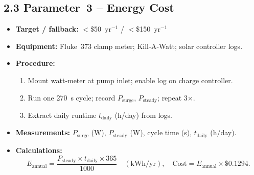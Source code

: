 \documentclass[12pt]{article}
\begin{document}
\subsection*{2.3 Parameter 3 – Energy Cost}
\begin{itemize}[leftmargin=*]
  \item \textbf{Target / fallback:} $<$\$50 yr$^{-1}$ / $<$\$150 yr$^{-1}$
  \item \textbf{Equipment:} Fluke 373 clamp meter; Kill‑A‑Watt; solar controller logs.
  \item \textbf{Procedure:}
    \begin{enumerate}[label=\arabic*., leftmargin=*]
      \item Mount watt‐meter at pump inlet; enable log on charge controller.
      \item Run one 270 s cycle; record $P_{\mathrm{surge}}$, $P_{\mathrm{steady}}$; repeat 3×.
      \item Extract daily runtime $t_{\mathrm{daily}}$ (h/day) from logs.
    \end{enumerate}
  \item \textbf{Measurements:} $P_{\mathrm{surge}}$ (W), $P_{\mathrm{steady}}$ (W), cycle time (s), $t_{\mathrm{daily}}$ (h/day).
  \item \textbf{Calculations:}
    \[
      E_{\mathrm{annual}}
        = \frac{P_{\mathrm{steady}}\times t_{\mathrm{daily}}\times365}{1000}
        \quad(\mathrm{kWh/yr}),
      \quad
      \text{Cost}
        = E_{\mathrm{annual}}\times\$0.1294.
    \]
\end{itemize}
\end{document}
